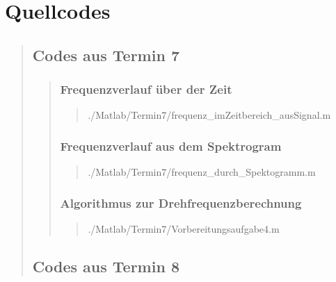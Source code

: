 \section{Quellcodes}
\begin{quote}

	\subsection{Codes aus Termin 7}
	\begin{quote}
	    
	    \subsubsection{Frequenzverlauf über der Zeit}
	    \begin{quote}
	        
	            {./Matlab/Termin7/frequenz_imZeitbereich_ausSignal.m}
	    \end{quote}

	    \subsubsection{Frequenzverlauf aus dem Spektrogram}
	    \begin{quote}
	        
	            {./Matlab/Termin7/frequenz_durch_Spektogramm.m}
	    \end{quote}

        \subsubsection{Algorithmus zur Drehfrequenzberechnung}
        \begin{quote}
            
                {./Matlab/Termin7/Vorbereitungsaufgabe4.m}
        \end{quote}
	    
	\end{quote}%
	
	\subsection{Codes aus Termin 8}
	\begin{quote}
	

\end{quote}
\end{quote}
